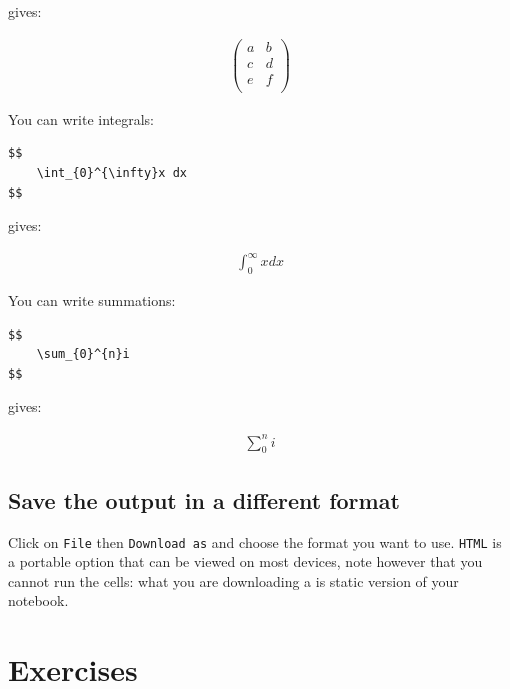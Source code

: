 gives:

\begin{equation*}
\begin{split}
    \begin{pmatrix}
        a&b\\
        c&d\\
        e&f\\
    \end{pmatrix}
\end{split}
\end{equation*}

You can write integrals:

\begin{verbatim}
$$
    \int_{0}^{\infty}x dx
$$
\end{verbatim}


gives:

\begin{equation*}
\begin{split}
    \int_{0}^{\infty}x dx
\end{split}
\end{equation*}

You can write summations:

\begin{verbatim}
$$
    \sum_{0}^{n}i
$$
\end{verbatim}


gives:

\begin{equation*}
\begin{split}
    \sum_{0}^{n}i
\end{split}
\end{equation*}

\subsection{Save the output in a different format}

Click on \texttt{File} then \texttt{Download as} and choose the format you want
to use. \texttt{HTML}
is a portable option that can be viewed on most devices, note however that you
cannot run the cells: what you are downloading a is static version of your
notebook.

\section{Exercises}

